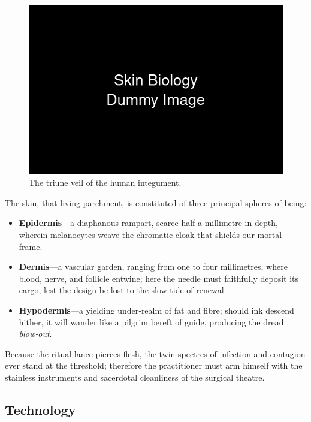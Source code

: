 \documentclass[11pt]{article}
\begin{document}
\begin{figure}
    \vspace{-20pt}
    \includegraphics[width=\linewidth]{figures/biology.png}
    \caption{The triune veil of the human integument.}
    \label{fig:biology_wrap}
\end{figure}

The skin, that living parchment, is constituted of three principal spheres of being:  

\begin{itemize}
    \item \textbf{Epidermis}—a diaphanous rampart, scarce half a millimetre in depth, wherein melanocytes weave the chromatic cloak that shields our mortal frame.  
    \item \textbf{Dermis}—a vascular garden, ranging from one to four millimetres, where blood, nerve, and follicle entwine; here the needle must faithfully deposit its cargo, lest the design be lost to the slow tide of renewal.  
    \item \textbf{Hypodermis}—a yielding under‑realm of fat and fibre; should ink descend hither, it will wander like a pilgrim bereft of guide, producing the dread \emph{blow‑out}.  
\end{itemize}

Because the ritual lance pierces flesh, the twin spectres of infection and contagion ever stand at the threshold; therefore the practitioner must arm himself with the stainless instruments and sacerdotal cleanliness of the surgical theatre.

\pagebreak

\subsection{Technology}
\end{document}
